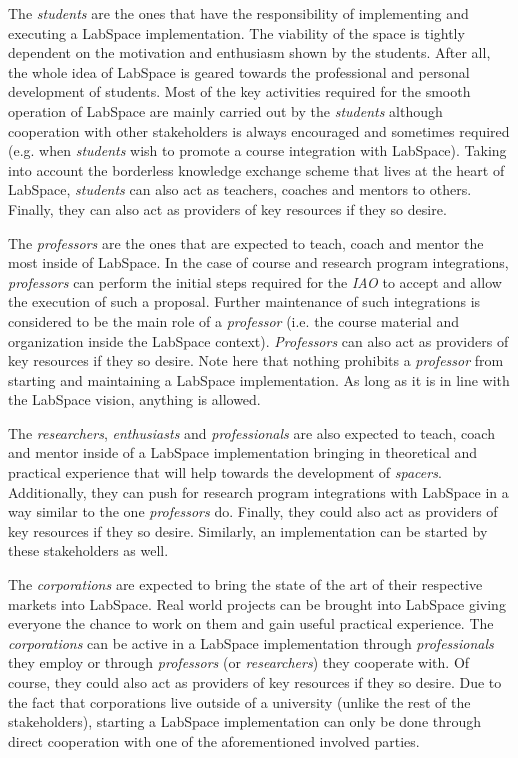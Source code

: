 \documentclass[a4paper, 11pt]{article}
\begin{document}
The \textit{students} are the ones that have the responsibility of implementing and executing a LabSpace implementation. The viability of the space is tightly dependent on the motivation and enthusiasm shown by the students. After all, the whole idea of LabSpace is geared towards the professional and personal development of students. Most of the key activities required for the smooth operation of LabSpace are mainly carried out by the \textit{students} although cooperation with other stakeholders is always encouraged and sometimes required (e.g. when \textit{students} wish to promote a course integration with LabSpace). Taking into account the borderless knowledge exchange scheme that lives at the heart of LabSpace, \textit{students} can also act as teachers, coaches and mentors to others. Finally, they can also act as providers of key resources if they so desire.

The \textit{professors} are the ones that are expected to teach, coach and mentor the most inside of LabSpace. In the case of course and research program integrations, \textit{professors} can perform the initial steps required for the \textit{IAO} to accept and allow the execution of such a proposal. Further maintenance of such integrations is considered to be the main role of a \textit{professor} (i.e. the course material and organization inside the LabSpace context). \textit{Professors} can also act as providers of key resources if they so desire. Note here that nothing prohibits a \textit{professor} from starting and maintaining a LabSpace implementation. As long as it is in line with the LabSpace vision, anything is allowed.

The \textit{researchers}, \textit{enthusiasts} and \textit{professionals} are also expected to teach, coach and mentor inside of a LabSpace implementation bringing in theoretical and practical experience that will help towards the development of \textit{spacers}. Additionally, they can push for research program integrations with LabSpace in a way similar to the one \textit{professors} do. Finally, they could also act as providers of key resources if they so desire. Similarly, an implementation can be started by these stakeholders as well.

The \textit{corporations} are expected to bring the state of the art of their respective markets into LabSpace. Real world projects can be brought into LabSpace giving everyone the chance to work on them and gain useful practical experience. The \textit{corporations} can be active in a LabSpace implementation through \textit{professionals} they employ or through \textit{professors} (or \textit{researchers}) they cooperate with. Of course, they could also act as providers of key resources if they so desire. Due to the fact that corporations live outside of a university (unlike the rest of the stakeholders), starting a LabSpace implementation can only be done through direct cooperation with one of the aforementioned involved parties.
\end{document}
